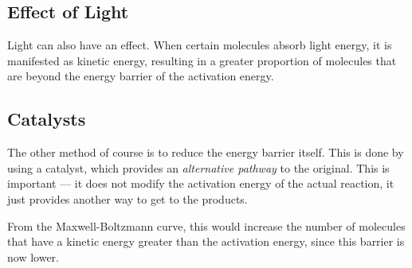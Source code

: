 

		\subsection{Effect of Light}

			Light can also have an effect. When certain molecules absorb light energy, it is manifested as kinetic energy, resulting in a
			greater proportion of molecules that are beyond the energy barrier of the activation energy.




		\pagebreak
		\subsection{Catalysts}

			The other method of course is to reduce the energy barrier itself. This is done by using a catalyst, which provides an
			\textit{alternative pathway} to the original. This is important --- it does not modify the activation energy of the actual
			reaction, it just provides another way to get to the products.

			From the Maxwell-Boltzmann curve, this would increase the number of molecules that have a kinetic energy greater
			than the activation energy, since this barrier is now lower.

